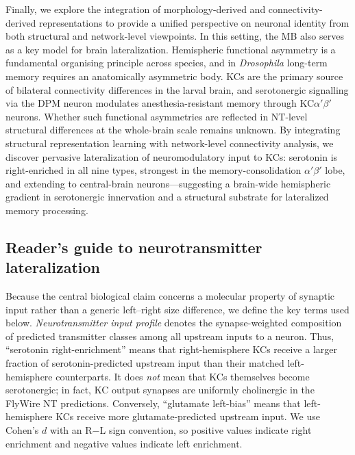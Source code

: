 \documentclass[10pt]{article}
\begin{document}
Finally, we explore the integration of morphology-derived and connectivity-derived representations to provide a unified perspective on neuronal identity from both structural and network-level viewpoints. In this setting, the MB also serves as a key model for brain lateralization. Hemispheric functional asymmetry is a fundamental organising principle across species\cite{karolis2019lateralisation,wan2024microstructural}, and in \textit{Drosophila} long-term memory requires an anatomically asymmetric body\cite{pascual2004lateralized}. KCs are the primary source of bilateral connectivity differences in the larval brain\cite{pedigo2023bilateral_elife,winding2023larva}, and serotonergic signalling via the DPM neuron modulates anesthesia-resistant memory through KC$\alpha'\beta'$ neurons\cite{keene2006dpm,waddell2013serotonin}. Whether such functional asymmetries are reflected in NT-level structural differences at the whole-brain scale remains unknown. By integrating structural representation learning with network-level connectivity analysis, we discover pervasive lateralization of neuromodulatory input to KCs: serotonin is right-enriched in all nine types, strongest in the memory-consolidation $\alpha'\beta'$ lobe, and extending to central-brain neurons---suggesting a brain-wide hemispheric gradient in serotonergic innervation and a structural substrate for lateralized memory processing.

\subsection*{Reader's guide to neurotransmitter lateralization}

Because the central biological claim concerns a molecular property of synaptic input rather than a generic left--right size difference, we define the key terms used below. \textit{Neurotransmitter input profile} denotes the synapse-weighted composition of predicted transmitter classes among all upstream inputs to a neuron. Thus, ``serotonin right-enrichment'' means that right-hemisphere KCs receive a larger fraction of serotonin-predicted upstream input than their matched left-hemisphere counterparts. It does \textit{not} mean that KCs themselves become serotonergic; in fact, KC output synapses are uniformly cholinergic in the FlyWire NT predictions. Conversely, ``glutamate left-bias'' means that left-hemisphere KCs receive more glutamate-predicted upstream input. We use Cohen's $d$ with an R$-$L sign convention, so positive values indicate right enrichment and negative values indicate left enrichment.
\end{document}
